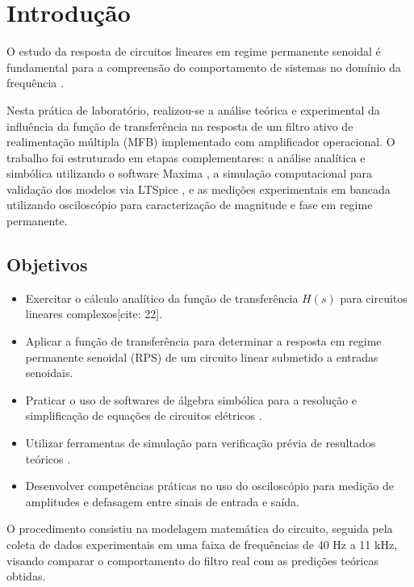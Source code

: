 \chapter{Introdução}

O estudo da resposta de circuitos lineares em regime permanente senoidal é fundamental para a compreensão do comportamento de sistemas no domínio da frequência \cite{nilsson}. 

Nesta prática de laboratório, realizou-se a análise teórica e experimental da influência da função de transferência na resposta de um filtro ativo de realimentação múltipla (MFB) implementado com amplificador operacional. O trabalho foi estruturado em etapas complementares: a análise analítica e simbólica utilizando o software Maxima \cite{maxima}, a simulação computacional para validação dos modelos via LTSpice \cite{ltspice}, e as medições experimentais em bancada utilizando osciloscópio para caracterização de magnitude e fase em regime permanente.

\section{Objetivos}

\begin{itemize}
	\item Exercitar o cálculo analítico da função de transferência $H(s)$ para circuitos lineares complexos[cite: 22].
	\item Aplicar a função de transferência para determinar a resposta em regime permanente senoidal (RPS) de um circuito linear submetido a entradas senoidais.
	\item Praticar o uso de softwares de álgebra simbólica para a resolução e simplificação de equações de circuitos elétricos \cite{maxima}.
	\item Utilizar ferramentas de simulação para verificação prévia de resultados teóricos \cite{ltspice}.
	\item Desenvolver competências práticas no uso do osciloscópio para medição de amplitudes e defasagem entre sinais de entrada e saída.
\end{itemize}

O procedimento consistiu na modelagem matemática do circuito, seguida pela coleta de dados experimentais em uma faixa de frequências de 40 Hz a 11 kHz, visando comparar o comportamento do filtro real com as predições teóricas obtidas.